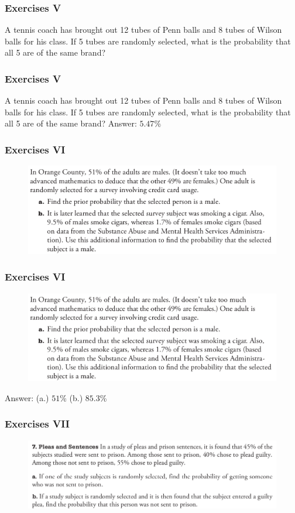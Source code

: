 \documentclass[xcolor=dvipsnames]{beamer}
\begin{document}
\begin{frame}
  \frametitle{Exercises V}
  A tennis coach has brought out 12 tubes of Penn balls and 8 tubes of
  Wilson balls for his class. If 5 tubes are randomly selected, what
  is the probability that all 5 are of the same brand?
\end{frame}

\begin{frame}
  \frametitle{Exercises V}
  A tennis coach has brought out 12 tubes of Penn balls and 8 tubes of
  Wilson balls for his class. If 5 tubes are randomly selected, what
  is the probability that all 5 are of the same brand? Answer: $5.47$\%
\end{frame}

\begin{frame}
  \frametitle{Exercises VI}
\begin{figure}[h]
\includegraphics[scale=.32]{./diagrams/triola_bayes1.png}
\end{figure}
\end{frame}

\begin{frame}
  \frametitle{Exercises VI}
\begin{figure}[h]
\includegraphics[scale=.32]{./diagrams/triola_bayes1.png}
\end{figure}
Answer: (a.) $51$\% (b.) $85.3$\%
\end{frame}

\begin{frame}
  \frametitle{Exercises VII}
\begin{figure}[h]
\includegraphics[scale=.36]{./diagrams/triola_bayes2.png}
\end{figure}
\end{frame}
\end{document}
